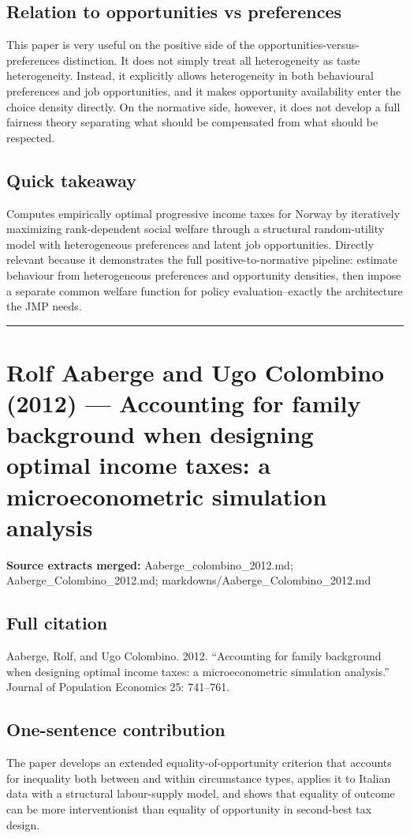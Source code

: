 \documentclass[11pt,a4paper]{article}
\begin{document}
\subsection*{Relation to opportunities vs preferences}
This paper is very useful on the positive side of the opportunities-versus-preferences distinction. It does not simply treat all heterogeneity as taste heterogeneity. Instead, it explicitly allows heterogeneity in both behavioural preferences and job opportunities, and it makes opportunity availability enter the choice density directly. On the normative side, however, it does not develop a full fairness theory separating what should be compensated from what should be respected.

\subsection*{Quick takeaway}
Computes empirically optimal progressive income taxes for Norway by iteratively maximizing rank-dependent social welfare through a structural random-utility model with heterogeneous preferences and latent job opportunities. Directly relevant because it demonstrates the full positive-to-normative pipeline: estimate behaviour from heterogeneous preferences and opportunity densities, then impose a separate common welfare function for policy evaluation--exactly the architecture the JMP needs.


\medskip\hrule\medskip

\section*{Rolf Aaberge and Ugo Colombino (2012) — Accounting for family background when designing optimal income taxes: a microeconometric simulation analysis}

\textbf{Source extracts merged:} Aaberge\_colombino\_2012.md; Aaberge\_Colombino\_2012.md; markdowns/Aaberge\_Colombino\_2012.md

\subsection*{Full citation}
Aaberge, Rolf, and Ugo Colombino. 2012. “Accounting for family background when designing optimal income taxes: a microeconometric simulation analysis.” Journal of Population Economics 25: 741–761.

\subsection*{One-sentence contribution}
The paper develops an extended equality-of-opportunity criterion that accounts for inequality both between and within circumstance types, applies it to Italian data with a structural labour-supply model, and shows that equality of outcome can be more interventionist than equality of opportunity in second-best tax design.
\end{document}
